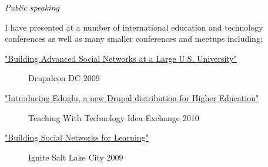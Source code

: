 \documentclass[11pt]{article}
\begin{document}
\bigskip

\noindent\emph{Public speaking}

\medskip

\noindent I have presented at a number of international education and technology conferences as well as many smaller conferences and meetups including:

\begin{description}
  \item[\href{http://www.archive.org/details/DrupalconDc2009-BuildingAdvancedSocialNetworksAtALargeU.s.University}{"Building Advanced Social Networks at a Large U.S. University"}] Drupalcon DC 2009
  \item[\href{http://ttix.org/archives/2010-sessions/introducing-eduglu-a-new-drupal-distribution-for-higher-education/}{"Introducing Eduglu, a new Drupal distribution for Higher Education"}] Teaching With Technology Idea Exchange 2010
  \item[\href{http://www.ignitesaltlake.com/ignite/index.cfm/videos/ignite-salt-lake-2/}{"Building Social Networks for Learning"}] Ignite Salt Lake City 2009
\end{description}
\end{document}
